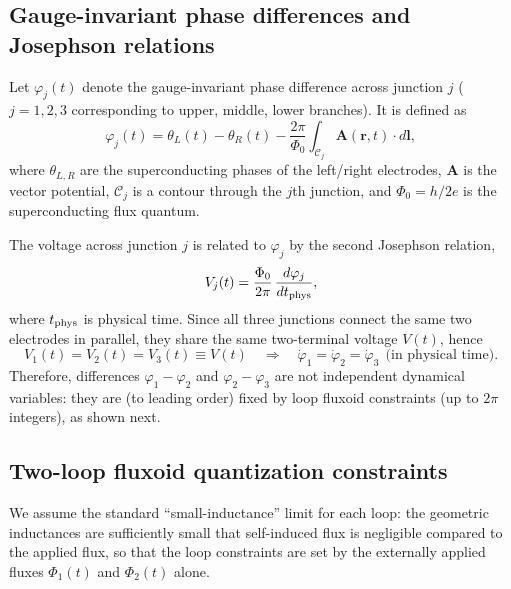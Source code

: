 \documentclass[prl,twocolumn,superscriptaddress,showpacs,nofootinbib]{revtex4-2}
\begin{document}
\subsection{Gauge-invariant phase differences and Josephson relations}
\label{sec:SM_gaugephase}
Let $\varphi_j(t)$ denote the gauge-invariant phase difference across junction $j$ ($j=1,2,3$ corresponding to upper, middle, lower branches). It is defined as
\begin{equation}
\varphi_j(t) = \theta_L(t)-\theta_R(t)
-\frac{2\pi}{\Phi_0}\int_{\mathcal{C}_j}\mathbf{A}(\mathbf{r},t)\cdot d\mathbf{l},
\label{eq:SM_gaugeinv_phase}
\end{equation}
where $\theta_{L,R}$ are the superconducting phases of the left/right
electrodes, $\mathbf{A}$ is the vector potential, $\mathcal{C}_j$ is a contour
through the $j$th junction, and $\Phi_0=h/2e$ is the superconducting flux
quantum.

The voltage across junction $j$ is related to $\varphi_j$ by the second Josephson
relation,
\begin{equation}
V_j(t)=\frac{\Phi_0}{2\pi}\,\frac{d\varphi_j}{dt_{\rm phys}},
\label{eq:SM_josephson_voltage}
\end{equation}
where $t_{\rm phys}$ is physical time. Since all three junctions connect the same two electrodes in parallel, they share the same two-terminal voltage
$V(t)$, hence
\begin{equation}
V_1(t)=V_2(t)=V_3(t)\equiv V(t)
\quad \Longrightarrow \quad
\dot\varphi_1=\dot\varphi_2=\dot\varphi_3
\ \ \text{(in physical time)}.
\label{eq:SM_commonV}
\end{equation}
Therefore, differences $\varphi_1-\varphi_2$ and $\varphi_2-\varphi_3$ are not
independent dynamical variables: they are (to leading order) fixed by loop
fluxoid constraints (up to $2\pi$ integers), as shown next.

\subsection{Two-loop fluxoid quantization constraints}
\label{sec:SM_fluxoid}
We assume the standard ``small-inductance'' limit for each loop:
the geometric inductances are sufficiently small that self-induced flux is
negligible compared to the applied flux, so that the loop constraints are set
by the externally applied fluxes $\Phi_1(t)$ and $\Phi_2(t)$ alone.
\end{document}
